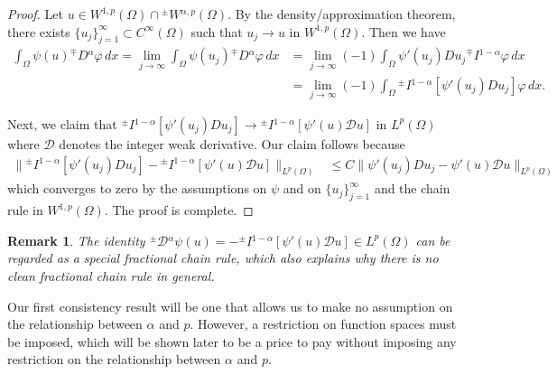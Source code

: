 \documentclass[leqno,final]{siamltex}
\numberwithin{equation}{section}
\newtheorem{remark}{Remark}[section]
\renewcommand{\(}{\bigl(}
\renewcommand{\)}{\bigr)}
\begin{document}
        \begin{proof}
            Let $u \in W^{1,p}(\Omega) \cap {^{\pm}}{W}{^{\alpha,p}}(\Omega)$. By the density/approximation theorem, there exists $\{u_j\}_{j=1}^{\infty} \subset C^{\infty}(\Omega)$ 
            such that $u_j \rightarrow u$ in $W^{1,p}(\Omega)$. Then we have  
            \begin{align*}
                \int_{\Omega} \psi(u) {^{\mp}}{D}{^{\alpha}}\varphi\, dx = \lim_{j\rightarrow \infty} \int_{\Omega} \psi (u_j) {^{\mp}}{D}{^{\alpha}}\varphi \, dx
                &= \lim_{j \rightarrow \infty} (-1) \int_{\Omega} \psi' (u_j) Du_{j} {^{\mp}}{I}{^{1-\alpha}} \varphi\, dx \\ 
                &= \lim_{j \rightarrow \infty} (-1)\int_{\Omega}  {^{\pm}}{I}{^{1- \alpha}} [ \psi'(u_j) Du_j] \varphi \, dx.
            \end{align*}
           
           Next, we claim that ${^{\pm}}{I}{^{1-\alpha}} [ \psi ' (u_j) Du_j] \rightarrow {^{\pm}}{I}{^{1-\alpha}} [ \psi'(u)\mathcal{D}u]$ in $L^{p}(\Omega)$ where $\mathcal{D}$ denotes the integer weak derivative. Our claim follows because 
            \begin{align*}
                \|{^{\pm}}{I}{^{1-\alpha}} [\psi'(u_j) D u_j] - {^{\pm}}{I}{^{1-\alpha}} [ \psi'(u)\mathcal{D}u]\|_{L^{p}(\Omega)} &\leq C \| \psi'(u_j) Du_j - \psi'(u)\mathcal{D}u\|_{L^{p}(\Omega)}
            \end{align*}
            which converges to zero by the assumptions on $\psi$ and on $\{u_j\}_{j=1}^{\infty}$ and the chain rule in $W^{1,p}(\Omega)$.
            The proof is complete. 
        \end{proof}
        
        \begin{remark}
        	The identity ${^{\pm}}{\mathcal{D}}{^{\alpha}} \psi(u)= -{^{\pm}}{I}{^{1- \alpha}} [ \psi'(u) \mathcal{D}u] \in L^{p}(\Omega)$ can be regarded as a special fractional chain rule, which also explains why there is no clean fractional chain rule in general. 
        \end{remark}
        
        
        Our first consistency result will be one that allows us to make no assumption on the relationship 
        between $\alpha$ and $p$. However, a restriction on function spaces must be imposed, which will be shown 
        later to be a price to pay without imposing any restriction on the relationship between $\alpha$ and $p$.
        
\end{document}
